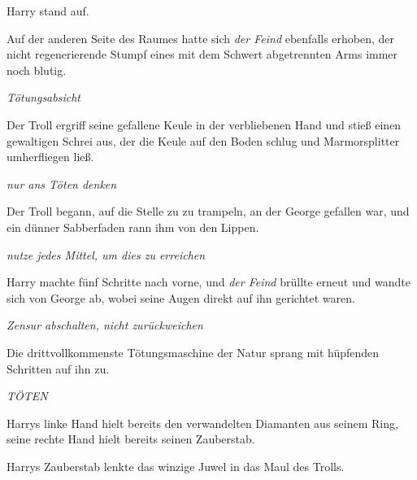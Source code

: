 Harry stand auf.

Auf der anderen Seite des Raumes hatte sich \emph{der Feind} ebenfalls erhoben, der nicht regenerierende Stumpf eines mit dem Schwert abgetrennten Arms immer noch blutig.

\emph{Tötungsabsicht}

Der Troll ergriff seine gefallene Keule in der verbliebenen Hand und stieß einen gewaltigen Schrei aus, der die Keule auf den Boden schlug und Marmorsplitter umherfliegen ließ.

\emph{nur ans Töten denken}

Der Troll begann, auf die Stelle zu zu trampeln, an der George gefallen war, und ein dünner Sabberfaden rann ihm von den Lippen.

\emph{nutze jedes Mittel, um dies zu erreichen}

Harry machte fünf Schritte nach vorne, und \emph{der Feind} brüllte erneut und wandte sich von George ab, wobei seine Augen direkt auf ihn gerichtet waren.

\emph{Zensur abschalten, nicht zurückweichen}

Die drittvollkommenste Tötungsmaschine der Natur sprang mit hüpfenden Schritten auf ihn zu.

\emph{TÖTEN}

Harrys linke Hand hielt bereits den verwandelten Diamanten aus seinem Ring, seine rechte Hand hielt bereits seinen Zauberstab.


Harrys Zauberstab lenkte das winzige Juwel in das Maul des Trolls.

